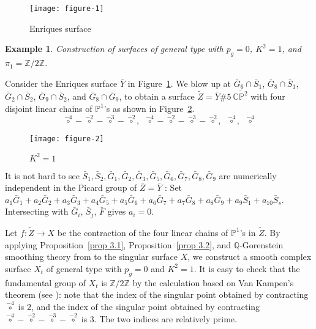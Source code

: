 \documentclass[twoside,11pt]{amsart}
\newtheorem{example}{Example}[section]
\begin{document}
\begin{figure}
\centering
\texttt{[image: figure-1]}
\caption{Enriques surface}
\label{figure:Enriques}
\end{figure}

\begin{example}
Construction of surfaces of general type with $p_g=0$, $K^2=1$,
and $\pi_1={{\mathbb Z}}/2{{\mathbb Z}}$.
\end{example}

Consider the Enriques surface $\bar Y$ in
Figure~\ref{figure:Enriques}. We blow up at $\bar G_6 \cap \bar
S_1$, $\bar G_8 \cap \bar S_1$, $\bar G_2 \cap \bar S_2$, $\bar
G_9 \cap \bar S_2$, and $\bar G_8 \cap \bar G_9$, to obtain a
surface $\tilde Z=\bar Y\# 5\ \overline{{{\mathbb C}}{{\mathbb P}}^2}$ with four
disjoint linear chains of ${{\mathbb P}}^1$'s as shown in
Figure~\ref{figure:K^2=1}.
\[ {\overset{-4}{\circ}}-{\overset{-2}{\circ}}-{\overset{-3}{\circ}}-{\overset{-2}{\circ}},
\,\, \,
{\overset{-4}{\circ}}-{\overset{-2}{\circ}}-{\overset{-3}{\circ}}-{\overset{-2}{\circ}},
\,\, \,
{\overset{-4}{\circ}},
\,\, \,
{\overset{-4}{\circ}}
\]

{\medskip}

\begin{figure}
\centering
\texttt{[image: figure-2]}
\caption{$K^2=1$}
\label{figure:K^2=1}
\end{figure}

{\medskip} It is not hard to see $\bar S_1, \bar S_2, \bar G_1, \bar G_2,
\bar G_3, \bar G_5, \bar G_6, \bar G_7, \bar G_8, \bar G_9$ are
numerically independent in the Picard group of $\bar Z=\bar Y$ :
Set $a_1\bar G_1+a_2\bar G_2+a_3\bar G_3+a_4\bar G_5+a_5\bar
G_6+a_6\bar G_7+a_7\bar G_8+a_8\bar G_9 +a_9\bar S_1+a_{10}\bar
S_s$. Intersecting with $\bar G_i$, $\bar S_j$, $\bar F$ gives
$a_i=0$.

Let $f: \tilde Z\to X$ be the contraction of the four linear
chains of ${{\mathbb P}}^1$'s in $\tilde Z$. By applying
Proposition~\ref{prop 3.1}, Proposition~\ref{prop 3.2}, and
${{\mathbb Q}}$-Gorenstein smoothing theory from \cite{LP1} to the singular
surface $X$, we construct a smooth complex surface $X_t$ of
general type with $p_g=0$ and $K^2=1$. It is easy to check that
the fundamental group of $X_t$ is ${{\mathbb Z}}/2{{\mathbb Z}}$ by the calculation
based on Van Kampen's theorem (see \cite{LP1}): note that the
index of the singular point obtained by contracting
${\overset{-4}{\circ}}$ is 2, and the index of the singular point
obtained by contracting
${\overset{-4}{\circ}}-{\overset{-2}{\circ}}-{\overset{-3}{\circ}}-{\overset{-2}{\circ}}$
is 3. The two indices are relatively prime.
\end{document}

